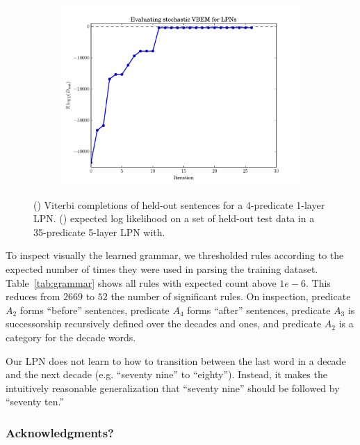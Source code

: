 \documentclass{article} %
\begin{document}
\begin{figure}
\begin{subfigure}[b]{0.45\linewidth}
\begin{tabular}{>{\footnotesize} l >{\footnotesize} l}
      \end{tabular}
      \caption{}
      \label{tab:results}
  \end{subfigure}
  \hfill
  \begin{subfigure}[b]{0.45\linewidth}
    \includegraphics[width=\linewidth]{figures/train_number_net_0006_held_out.pdf}
    \caption{}
    \label{fig:heldoutLL}
  \end{subfigure}
  \caption{() Viterbi completions of held-out sentences for a 4-predicate 1-layer LPN. () expected log likelihood on a set of held-out test data in a 35-predicate 5-layer LPN with.}
\end{figure}

To inspect visually the learned grammar, we thresholded rules
according to the expected number of times they were used in parsing
the training dataset. Table~\ref{tab:grammar} shows all rules with
expected count above $1e-6$. This reduces from $2669$ to $52$ the
number of significant rules. On inspection, predicate $A_2$ forms
``before'' sentences, predicate $A_4$ forms ``after'' sentences,
predicate $A_3$ is successorship recursively defined over the decades
and ones, and predicate $A_2$ is a category for the decade words.

Our LPN does not learn to how to transition between the last word in a decade
and the next decade (e.g. ``seventy nine'' to ``eighty''). Instead, it
makes the intuitively reasonable generalization that ``seventy nine''
should be followed by ``seventy ten.'' 

\subsubsection*{Acknowledgments?}



\end{document}
